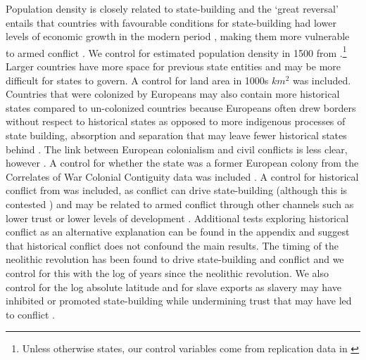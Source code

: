 Population density is closely related to state-building \citep{Herbst2014} and
the `great reversal' entails that countries with favourable conditions for
state-building had lower levels of economic growth in the modern period
\citep{Acemoglu2001}, making them more vulnerable to armed conflict
\citep{Fearon2003a}. We control for estimated population density in 1500 from
\citet{Dincecco2019}.\footnote{Unless otherwise states, our control variables
come from replication data in \citet{Dincecco2019}}  Larger countries have more
space for previous state entities and may be more difficult for states to
govern. A control for land area in 1000s $km^2$ was included. Countries that
were colonized by Europeans may also contain more historical states compared to
un-colonized countries because Europeans often drew borders without respect to
historical states as opposed to more indigenous processes of state building,
absorption and separation that may leave fewer historical states behind
\citep{Tilly1990}. The link between European colonialism and civil conflicts is less
clear, however \citep{Hegre2001}. A control for whether the state was a former
European colony from the Correlates of War Colonial Contiguity data was included
\citep{CorrelatesofWarProject2016}. A control for historical conflict from
\citet{Dincecco2019} was included, as conflict can drive state-building
(although this is contested \citep{Osafo-Kwaako2013}) and may be related to
armed conflict through other channels such as lower trust \citep{Besley2014} or
lower levels of development \citep{Englebert2002}. Additional tests exploring historical conflict as an alternative explanation can be found in the appendix and suggest that historical conflict does not confound the main results. The timing of the neolithic
revolution has been found to drive state-building and conflict \citep{Paine2019}
and we control for this with the log of years since the neolithic revolution. We
also control for the log absolute latitude and for slave exports as slavery may
have inhibited or promoted state-building while undermining trust that may have
led to conflict \citep{Nunn2008}.

